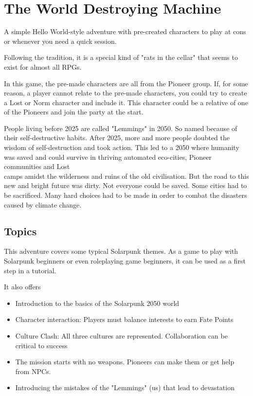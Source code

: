 \chapter{The World Destroying Machine}
\label{ch:the world destroying machine}

A simple Hello World-style adventure with pre-created characters to play at cons or whenever you need a quick session.

Following the tradition, it is a special kind of "rats in the cellar" that seems to exist for almost all RPGs.

In this game, the pre-made characters are all from the Pioneer group. If, for some reason, a player cannot relate to the pre-made characters, you could try to create a Lost or Norm character and include it. This character could be a relative of one of the Pioneers and join the party at the start.

\begin{sidebarBox}[title=Dirty Road to Eden]

People living before 2025 are called "Lemmings" in 2050. So named because of their self-destructive habits. After 2025, more and more people doubted the wisdom of self-destruction and took action. This led to a 2050 where humanity was saved and could survive in thriving automated eco-cities, Pioneer communities and Lost\\ camps amidst the wilderness and ruins of the old civilisation. But the road to this new and bright future was dirty. Not everyone could be saved. Some cities had to be sacrificed. Many hard choices had to be made in order to combat the disasters caused by climate change.

\end{sidebarBox}

\section{Topics}

This adventure covers some typical Solarpunk themes. As a game to play with Solarpunk beginners or even roleplaying game beginners, it can be used as a first step in a tutorial.

It also offers

\begin{itemize}
\item Introduction to the basics of the Solarpunk 2050 world
\item Character interaction: Players must balance interests to earn Fate Points
\item Culture Clash: All three cultures are represented. Collaboration can be critical to success
\item The mission starts with no weapons. Pioneers can make them or get help from NPCs.
\item Introducing the mistakes of the "Lemmings" (us) that lead to devastation
\end{itemize}

